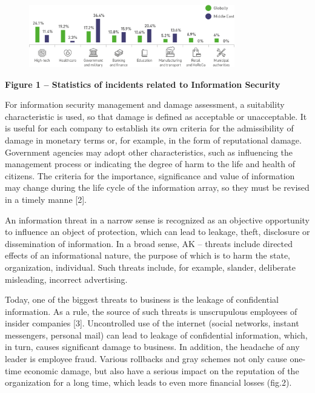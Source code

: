 \begin{figure}[H]
	\centering
	\includegraphics[width=0.8\textwidth]{assets/63}
	\caption*{}
\end{figure}\textbf{Figure
1 -- Statistics of incidents related to Information Security}

For information security management and damage assessment, a suitability
characteristic is used, so that damage is defined as acceptable or
unacceptable. It is useful for each company to establish its own
criteria for the admissibility of damage in monetary terms or, for
example, in the form of reputational damage. Government agencies may
adopt other characteristics, such as influencing the management process
or indicating the degree of harm to the life and health of citizens. The
criteria for the importance, significance and value of information may
change during the life cycle of the information array, so they must be
revised in a timely manne {[}2{]}.

An information threat in a narrow sense is recognized as an objective
opportunity to influence an object of protection, which can lead to
leakage, theft, disclosure or dissemination of information. In a broad
sense, AK -- threats include directed effects of an informational
nature, the purpose of which is to harm the state, organization,
individual. Such threats include, for example, slander, deliberate
misleading, incorrect advertising.

Today, one of the biggest threats to business is the leakage of
confidential information. As a rule, the source of such threats is
unscrupulous employees of insider companies {[}3{]}. Uncontrolled use of
the internet (social networks, instant messengers, personal mail) can
lead to leakage of confidential information, which, in turn, causes
significant damage to business. In addition, the headache of any leader
is employee fraud. Various rollbacks and gray schemes not only cause
one-time economic damage, but also have a serious impact on the
reputation of the organization for a long time, which leads to even more
financial losses (fig.2).

